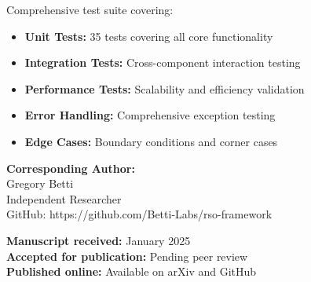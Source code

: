 \documentclass[11pt,a4paper]{article}
\begin{document}
Comprehensive test suite covering:

\begin{itemize}
    \item \textbf{Unit Tests:} 35 tests covering all core functionality
    \item \textbf{Integration Tests:} Cross-component interaction testing
    \item \textbf{Performance Tests:} Scalability and efficiency validation
    \item \textbf{Error Handling:} Comprehensive exception testing
    \item \textbf{Edge Cases:} Boundary conditions and corner cases
\end{itemize}

\vspace{1cm}

\noindent\textbf{Corresponding Author:}\\
Gregory Betti\\
Independent Researcher\\
GitHub: https://github.com/Betti-Labs/rso-framework

\vspace{0.5cm}

\noindent\textbf{Manuscript received:} January 2025\\
\textbf{Accepted for publication:} Pending peer review\\
\textbf{Published online:} Available on arXiv and GitHub
\end{document}
